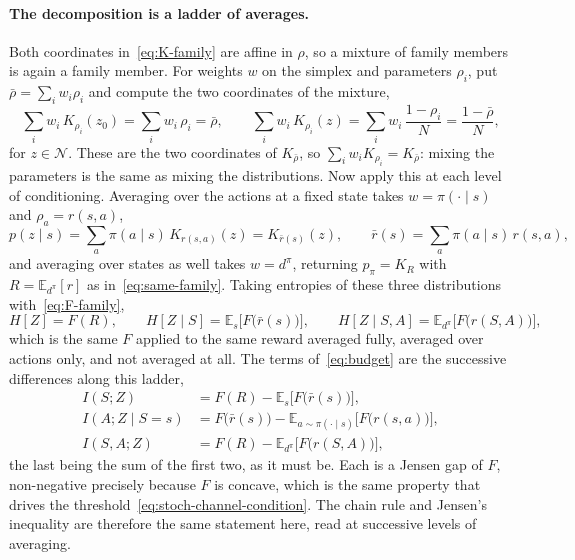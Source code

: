 \documentclass[11pt]{article}
\theoremstyle{remark}
\newcommand{\Ncal}{\mathcal N}
\newcommand{\E}{\mathbb E}
\newcommand{\1}{\mathds{1}}
\newcommand{\occ}{d^{\pi}}
\newcommand{\pz}{p_{\pi}}
\newcommand{\Hf}[1]{H\!\left[#1\right]}
\begin{document}
\paragraph{The decomposition is a ladder of averages.}
Both coordinates in~\eqref{eq:K-family} are affine in $\rho$, so a mixture of family members is again a family member.
For weights $w$ on the simplex and parameters $\rho_i$, put $\bar\rho=\sum_iw_i\rho_i$ and compute the two coordinates of the mixture,
\begin{equation}
  \sum_i w_i\,K_{\rho_i}(z_0)=\sum_i w_i\,\rho_i=\bar\rho,
  \qquad
  \sum_i w_i\,K_{\rho_i}(z)=\sum_i w_i\,\frac{1-\rho_i}{N}=\frac{1-\bar\rho}{N} ,
  \label{eq:channel-affine}
\end{equation}
for $z\in\Ncal$.
These are the two coordinates of $K_{\bar\rho}$, so $\sum_iw_iK_{\rho_i}=K_{\bar\rho}$: mixing the parameters is the same as mixing the distributions.
Now apply this at each level of conditioning.
Averaging over the actions at a fixed state takes $w=\pi(\cdot\mid s)$ and $\rho_a=r(s,a)$,
\begin{equation}
  p(z\mid s)=\sum_a\pi(a\mid s)\,K_{r(s,a)}(z)=K_{\bar r(s)}(z),
  \qquad
  \bar r(s)=\sum_a\pi(a\mid s)\,r(s,a) ,
  \label{eq:mix-actions}
\end{equation}
and averaging over states as well takes $w=\occ$, returning $\pz=K_R$ with $R=\E_{\occ}[r]$ as in~\eqref{eq:same-family}.
Taking entropies of these three distributions with~\eqref{eq:F-family},
\begin{equation}
  \Hf{Z}=F(R),
  \qquad
  \Hf{Z\mid S}=\E_{s}\big[F\big(\bar r(s)\big)\big],
  \qquad
  \Hf{Z\mid S,A}=\E_{\occ}\big[F\big(r(S,A)\big)\big],
  \label{eq:F-ladder}
\end{equation}
which is the same $F$ applied to the same reward averaged fully, averaged over actions only, and not averaged at all.
The terms of~\eqref{eq:budget} are the successive differences along this ladder,
\begin{align}
  I(S;Z) &= F(R)-\E_{s}\big[F\big(\bar r(s)\big)\big],
  \label{eq:jensen-state}\\
  I(A;Z\mid S=s) &= F\big(\bar r(s)\big)-\E_{a\sim\pi(\cdot\mid s)}\big[F\big(r(s,a)\big)\big],
  \label{eq:jensen-local}\\
  I(S,A;Z) &= F(R)-\E_{\occ}\big[F\big(r(S,A)\big)\big],
  \label{eq:jensen-global}
\end{align}
the last being the sum of the first two, as it must be.
Each is a Jensen gap of $F$, non-negative precisely because $F$ is concave, which is the same property that drives the threshold~\eqref{eq:stoch-channel-condition}.
The chain rule and Jensen's inequality are therefore the same statement here, read at successive levels of averaging.
\end{document}
